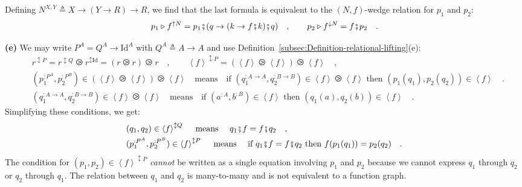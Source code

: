 Defining $N^{X,Y}\triangleq X\rightarrow\left(Y\rightarrow R\right)\rightarrow R$,
we find that the last formula is equivalent to the $\left(N,f\right)$-wedge
relation for $p_{1}$ and $p_{2}$:
\[
p_{1}\triangleright f^{\uparrow N}=p_{1}\bef(q\rightarrow(k\rightarrow f\bef k)\bef q)\quad,\quad\quad p_{2}\triangleright f^{\downarrow N}=f\bef p_{2}\quad.
\]

\textbf{(e)} We may write $P^{A}=Q^{A}\rightarrow\text{Id}^{A}$ with
$Q^{A}\triangleq A\rightarrow A$ and use Definition~\ref{subsec:Definition-relational-lifting}(e):
\begin{align*}
 & r^{\updownarrow P}=r^{\updownarrow Q}\ogreaterthan r^{\updownarrow\text{Id}}=(r\ogreaterthan r)\ogreaterthan r\quad,\quad\quad\left<f\right>^{\updownarrow P}=(\left<f\right>\ogreaterthan\left<f\right>)\ogreaterthan\left<f\right>\quad,\\
 & (p_{1}^{:P^{A}},p_{2}^{:P^{B}})\in(\left<f\right>\ogreaterthan\left<f\right>)\ogreaterthan\left<f\right>\quad\text{means}\quad\text{if }(q_{1}^{:A\rightarrow A},q_{2}^{:B\rightarrow B})\in\left<f\right>\ogreaterthan\left<f\right>\text{ then }(p_{1}(q_{1}),p_{2}(q_{2}))\in\left<f\right>\quad.\\
 & (q_{1}^{:A\rightarrow A},q_{2}^{:B\rightarrow B})\in\left<f\right>\ogreaterthan\left<f\right>\quad\text{means}\quad\text{if }(a^{:A},b^{:B})\in\left<f\right>\text{ then }(q_{1}(a),q_{2}(b))\in\left<f\right>\quad.
\end{align*}
Simplifying these conditions, we get:
\begin{align}
 & (q_{1},q_{2})\in\left<f\right>^{\updownarrow Q}\quad\text{ means }\quad q_{1}\bef f=f\bef q_{2}\quad,\nonumber \\
 & (p_{1}^{:P^{A}},p_{2}^{:P^{B}})\in\left<f\right>^{\updownarrow P}\quad\text{ means }\quad\text{if }q_{1}\bef f=f\bef q_{2}\text{ then }f(p_{1}(q_{1}))=p_{2}(q_{2})\quad.\label{eq:relational-lifting-example-e-derivation1}
\end{align}
The condition for $(p_{1},p_{2})\in\left<f\right>^{\updownarrow P}$
\emph{cannot} be written as a single equation involving $p_{1}$ and
$p_{2}$ because we cannot express $q_{1}$ through $q_{2}$ or $q_{2}$
through $q_{1}$. The relation between $q_{1}$ and $q_{2}$ is many-to-many
and is not equivalent to a function graph.

